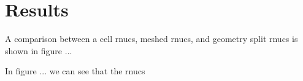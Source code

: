 \section{Results}

A comparison between a cell rnucs, meshed rnucs, and geometry split rnucs is shown 
in figure ...

In figure ... we can see that the rnucs 
